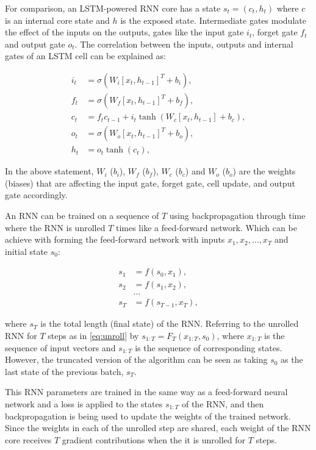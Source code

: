 For comparison, an LSTM-powered RNN core \cite{Hochreiter1997} has a state $s_t = (c_t, h_t)$ where $c$ is an internal core state and $h$ is the exposed state. Intermediate gates modulate the effect of the inputs on the outputs, gates like the input gate $i_t$, forget gate $f_t$ and output gate $o_t$. The correlation between the inputs, outputs and internal gates of an LSTM cell can be explained as:

\begin{align*}
i_t &= \sigma(W_i [x_t, h_{t-1}]^T + b_i), \\
f_t &= \sigma(W_f [x_t, h_{t-1}]^T + b_f), \\
c_t &= f_t c_{t-1} + i_t \tanh(W_c [x_t, h_{t-1}] + b_c), \\
o_t &= \sigma(W_o [x_t, h_{t-1}]^T + b_o), \\
h_t &= o_t \tanh(c_t),
\end{align*}

In the above statement, $W_i$ ($b_i$), $W_f$ ($b_f$), $W_c$ ($b_c$) and $W_o$ ($b_o$) are the weights (biases) that are affecting the input gate, forget gate, cell update, and output gate accordingly.

An RNN can be trained on a sequence of $T$ using backpropagation through time where the RNN is unrolled $T$ times like a feed-forward network.
Which can be achieve with forming the feed-forward network with inputs
$x_1, x_2, \dots, x_T$ and initial state $s_0$:

\begin{align}
s_1 &= f(s_0, x_1), \nonumber \\
s_2 &= f(s_1, x_2), \nonumber \\
&\dots \nonumber \\
\label{eq:unroll}
s_T &= f(s_{T-1}, x_T), 
\end{align}

where $s_T$ is the total length (final state) of the RNN.
Referring to the unrolled RNN for $T$ steps as in \eqref{eq:unroll} by $s_{1:T} = F_T(x_{1:T}, s_0)$,
where $x_{1:T}$ is the sequence of input vectors and $s_{1:T}$ is the sequence of corresponding states. However, the truncated version of the algorithm can be seen as taking $s_0$ as the last state of the previous batch, $s_T$.

This RNN parameters are trained in the same way as a feed-forward neural network and a loss is applied to the states $s_{1:T}$ of the RNN, and then backpropagation is being used to update the weights of the trained network.
Since the weights in each of the unrolled step are shared, each weight of the RNN core receives $T$ gradient contributions when the it is unrolled for $T$ steps.

